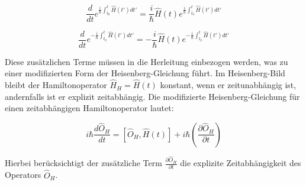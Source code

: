 \[
\frac{d}{d t} e^{\frac{i}{\hbar} \int_{t_0}^{t} \hat{H}(t') dt'} = \frac{i}{\hbar} \hat{H}(t) e^{\frac{i}{\hbar} \int_{t_0}^{t} \hat{H}(t') dt'}
\]

\[
\frac{d}{d t} e^{-\frac{i}{\hbar} \int_{t_0}^{t} \hat{H}(t') dt'} = -\frac{i}{\hbar} \hat{H}(t) e^{-\frac{i}{\hbar} \int_{t_0}^{t} \hat{H}(t') dt'}
\]

Diese zusätzlichen Terme müssen in die Herleitung einbezogen werden, was zu einer modifizierten Form der Heisenberg-Gleichung führt. Im Heisenberg-Bild bleibt der Hamiltonoperator \(\hat{H}_H = \hat{H}(t)\) konstant, wenn er zeitunabhängig ist, andernfalls ist er explizit zeitabhängig. Die modifizierte Heisenberg-Gleichung für einen zeitabhängigen Hamiltonoperator lautet:

\[
i \hbar \frac{d \hat{O}_H}{d t} = [\hat{O}_H, \hat{H}(t)] + i \hbar \left(\frac{\partial \hat{O}_H}{\partial t}\right)
\]

Hierbei berücksichtigt der zusätzliche Term \(\frac{\partial \hat{O}_H}{\partial t}\) die explizite Zeitabhängigkeit des Operators \(\hat{O}_H\).